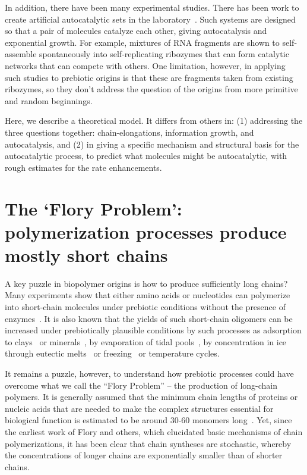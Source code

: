 \documentclass[journal=jacsat,manuscript=article,layout=twocolumn]{achemso}
\begin{document}
 In addition, there have been many experimental studies.  There has been work to create artificial autocatalytic sets in the laboratory~\cite{VonKiedrowski1986,Lincoln2009,Vaidya2012}. Such systems are designed so that a pair of molecules catalyze each other, giving autocatalysis and exponential growth.  For example, mixtures of RNA fragments are shown to self-assemble spontaneously into self-replicating ribozymes that can form catalytic networks that can compete with others.  One limitation, however, in applying such studies to prebiotic origins is that these are fragments taken from existing ribozymes, so they don't address the question of the origins from more primitive and random beginnings.
 
  Here, we describe a theoretical model.  It differs from others in: (1) addressing the three questions together: chain-elongations, information growth, and autocatalysis, and (2) in giving a specific mechanism and structural basis for the autocatalytic process, to predict what molecules might be autocatalytic, with rough estimates for the rate enhancements.
 
 \section{The `Flory Problem': polymerization processes produce mostly short chains}
 \label{sec:flory} 

A key puzzle in biopolymer origins is how to produce sufficiently long chains?  Many experiments 
show that either amino acids or nucleotides can polymerize into short-chain molecules under 
prebiotic conditions without the presence of 
enzymes~\cite{Shock1992,Martin1998,PAECHT-HOROWITZ1970,Leman2004a,Orgel2004}.  It is also known that 
the yields of such short-chain oligomers can be increased under prebiotically plausible conditions 
by such processes as adsorption to clays~\cite{Rao1980,Lambert2008} or 
minerals~\cite{Bernal1949,Ferris1996}, by evaporation of tidal pools~\cite{Nelson2001}, by 
concentration in ice through eutectic melts~\cite{Kanavarioti2001} or freezing~\cite{Bada2004} or 
temperature cycles. 

It remains a puzzle, however, to understand how prebiotic processes could have overcome what 
we call the ``Flory Problem'' -- the production of long-chain polymers.  It is generally assumed 
that the minimum chain lengths of proteins or nucleic acids that are needed to make the complex 
structures essential for biological function is estimated to be around 30-60 monomers 
long~\cite{Szostak1993}.  Yet, since the earliest work of Flory and others, which elucidated basic 
mechanisms of chain polymerizations, it has been clear that chain syntheses are stochastic, whereby 
the concentrations of longer chains are exponentially smaller than of shorter chains. 
\end{document}
